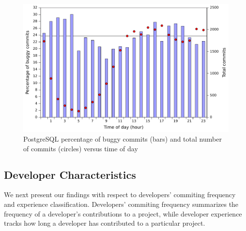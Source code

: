 \begin{figure}
\begin{center}
\includegraphics[width=\columnwidth]{postgresql-bugginess-hour.pdf}
\end{center}
\caption{PostgreSQL percentage of buggy commits (bars) and total number of commits (circles) versus time of day}
\label{fig-postgresql-bugginess-hour}
\end{figure}



\subsection{Developer Characteristics}
We next present our findings with respect to developers' commiting 
frequency and experience classification. Developers'
commiting frequency summarizes the frequency of
a developer's contributions to a project, while developer experience
tracks how long a developer has contributed to a particular project.

